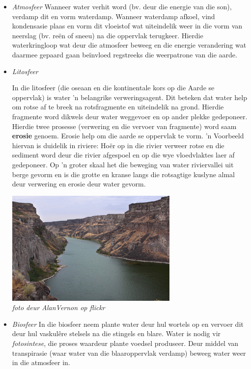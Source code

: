       \label{m38138*id334463}\begin{itemize}[noitemsep]
            \label{m38138*uid1}\item \textsl{Atmosfeer}
Wanneer water verhit word (bv. deur die energie van die son), verdamp dit en vorm waterdamp. Wanneer waterdamp afkoel, vind kondensasie plaas en vorm dit vloeistof wat uiteindelik weer in die vorm van neerslag (bv. re\"{e}n of sneeu) na die oppervlak terugkeer. Hierdie waterkringloop wat deur die atmosfeer beweeg en die energie verandering wat daarmee gepaard gaan beïnvloed regstreeks die weerpatrone van die aarde.
\label{m38138*uid2}\item \textsl{Litosfeer} \\
\begin{minipage}{.6\textwidth}
In die litosfeer (die oseaan en die kontinentale kors op die Aarde se oppervlak) is water  'n belangrike verweringsagent. Dit beteken dat water help om rotse af te breek na rotsfragmente en uiteindelik na grond. Hierdie fragmente word dikwels deur water weggevoer en op ander plekke gedeponeer. Hierdie twee prosesse (verwering en die vervoer van fragmente) word saam \textbf{erosie} genoem. Erosie help om die aarde se oppervlak te vorm.  'n Voorbeeld hiervan is duidelik in riviere: Ho\"{e}r op in die rivier verweer rotse en die sediment word deur die rivier afgespoel en op die wye vloedvlaktes laer af gedeponeer. Op  'n groter skaal het die beweging van water riviervallei uit berge gevorm en is die grotte en kranse langs die rotsagtige kuslyne almal deur verwering en erosie deur water gevorm.
\end{minipage}
\begin{minipage}{.4\textwidth}
 \begin{center}
  \includegraphics[width=.6\textwidth]{photos/AlanVernon.jpg}\\
\textsl{foto deur AlanVernon op flickr}
 \end{center}
\end{minipage}
\label{m38138*uid3}\item \textsl{Biosfeer}
In die biosfeer neem plante water deur hul wortels op en vervoer dit deur hul vaskul\^{e}re stelsels na die stingels en blare. Water is nodig vir \textsl{fotosintese}, die proses waardeur plante voedsel produseer. Deur middel van transpirasie (waar water van die blaaroppervlak verdamp) beweeg water weer in die atmosfeer in.
\end{itemize}


